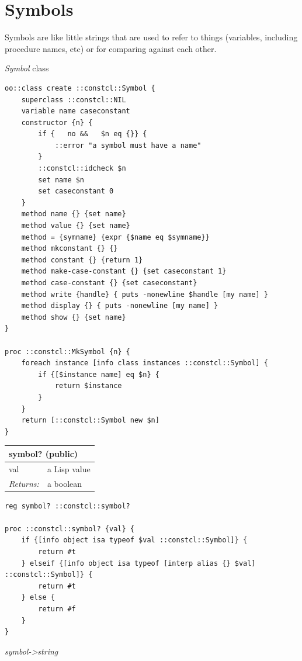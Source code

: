\documentclass[twoside,9pt]{report}
\begin{document}
\section{Symbols}
\label{symbols}

Symbols are like little strings that are used to refer to things (variables, including procedure names, etc) or for comparing against each other.


\emph{Symbol} class

\noindent\makebox[\linewidth]{\rule{\linewidth}{0.4pt}}
\begin{lstlisting}
oo::class create ::constcl::Symbol {
    superclass ::constcl::NIL
    variable name caseconstant
    constructor {n} {
        if {   no &&   $n eq {}} {
            ::error "a symbol must have a name"
        }
        ::constcl::idcheck $n
        set name $n
        set caseconstant 0
    }
    method name {} {set name}
    method value {} {set name}
    method = {symname} {expr {$name eq $symname}}
    method mkconstant {} {}
    method constant {} {return 1}
    method make-case-constant {} {set caseconstant 1}
    method case-constant {} {set caseconstant}
    method write {handle} { puts -nonewline $handle [my name] }
    method display {} { puts -nonewline [my name] }
    method show {} {set name}
}
 
proc ::constcl::MkSymbol {n} {
    foreach instance [info class instances ::constcl::Symbol] {
        if {[$instance name] eq $n} {
            return $instance
        }
    }
    return [::constcl::Symbol new $n]
}
\end{lstlisting}
\noindent\makebox[\linewidth]{\rule{\linewidth}{0.4pt}}
\begin{tabular}{ |l l| }
\hline
\multicolumn{2}{|l|}{symbol? (public)} \\
\hline
val & a Lisp value \\
\textit{Returns:} & a boolean \\
\hline
\end{tabular}

\noindent\makebox[\linewidth]{\rule{\linewidth}{0.4pt}}
\begin{lstlisting}
reg symbol? ::constcl::symbol?
 
proc ::constcl::symbol? {val} {
    if {[info object isa typeof $val ::constcl::Symbol]} {
        return #t
    } elseif {[info object isa typeof [interp alias {} $val] ::constcl::Symbol]} {
        return #t
    } else {
        return #f
    }
}
\end{lstlisting}
\noindent\makebox[\linewidth]{\rule{\linewidth}{0.4pt}}

\emph{symbol->string}
\end{document}
